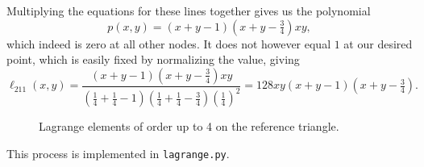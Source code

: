 \begin{solution}
    Multiplying the equations for these lines together gives us the polynomial
    \begin{equation*}
        p(x, y) = (x + y - 1)\left(x + y - \tfrac{3}{4}\right)xy,
    \end{equation*}
    which indeed is zero at all other nodes.
    It does not however equal $1$ at our desired point, which is easily fixed by normalizing the value, giving
    \begin{equation*}
        \ell_{211}(x, y) = \frac{
            (x + y - 1)\left(x + y - \tfrac{3}{4}\right)xy
        }{
            \left(\frac{1}{4} + \frac{1}{4} - 1\right)\left(\frac{1}{4} + \frac{1}{4} - \frac{3}{4}\right)\left(\frac{1}{4}\right)^2
        }
        = 128xy(x + y - 1)\left(x + y - \tfrac{3}{4}\right).
    \end{equation*}

    \begin{figure}[!h]
        \centering
        
        \caption{Lagrange elements of order up to 4 on the reference triangle.\label{fig:lagrange_elements_2}}
    \end{figure}

    This process is implemented in \verb|lagrange.py|.
\end{solution}
